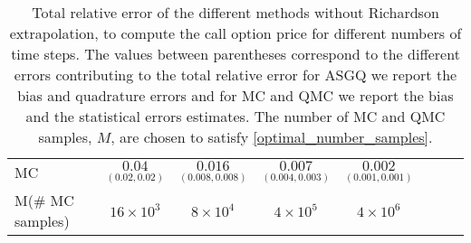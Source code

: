 \begin{table}[h!]
\begin{small}
\begin{tabular}{l*{6}{c}r}
			\hline
			MC    & $\underset{(0.02,0.02)}{\mathbf{0.04}}$  &  $\underset{(0.008,0.008)}{\mathbf{0.016}}$  & $\underset{(0.004,0.003)}{\mathbf{0.007}}$ & $\underset{(0.001,0.001)}{\mathbf{0.002}}$  \\	
			M(\# MC samples) 	& $16 \times 10^3$  &  $8 \times 10^4$  & $ 4 \times 10^5$ & $4 \times 10^6$  \\
			\bottomrule[1.25pt]
		\end{tabular}
		\caption{Total relative error of the different methods without Richardson extrapolation, to compute the call option price for different numbers of time steps. The values between parentheses correspond to the different errors contributing to the total relative error\red{;} for ASGQ we report the bias and quadrature errors and for MC and QMC we report the bias and the statistical errors estimates. The number of MC and QMC  samples, $M$, are chosen to satisfy \eqref{optimal_number_samples}.}
		\label{Total error of MISC and MC to compute Call option price of the different tolerances for different number of time steps. Case set 3, without Richardson extrapolation. The numbers between parentheses are the corresponding absolute errors.}
	\end{small}
\end{table}


